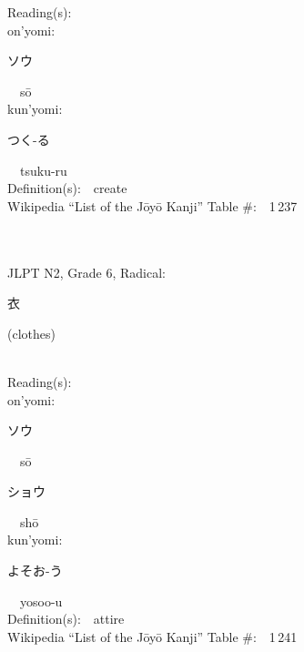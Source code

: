 \begin{multicols}{2}
Reading(s):\ \ \\
{\hspace*{1em}}on'yomi:\ \ \\
{\hspace*{2em}}{\begin{CJK}{UTF8}{min} ソウ \end{CJK}}\ \ s\=o\ \ \\
{\hspace*{1em}}kun'yomi:\ \ \\
{\hspace*{2em}}{\begin{CJK}{UTF8}{min} つく-る \end{CJK}}\ \ tsuku-ru\ \ \\
Definition(s):\ \ create \\
Wikipedia ``List of the J\=oy\=o Kanji'' Table \#:\ \ 1\,237 \\
\ \ \\
{\fontsize{34pt}{40pt}  }\ \ \\  %
{JLPT N2, Grade 6, Radical:\ \ {\begin{CJK}{UTF8}{min} 衣 \end{CJK}} (clothes) } \\
Reading(s):\ \ \\
{\hspace*{1em}}on'yomi:\ \ \\
{\hspace*{2em}}{\begin{CJK}{UTF8}{min} ソウ \end{CJK}}\ \ s\=o\ \ \\
{\hspace*{2em}}{\begin{CJK}{UTF8}{min} ショウ \end{CJK}}\ \ sh\=o\ \ \\
{\hspace*{1em}}kun'yomi:\ \ \\
{\hspace*{2em}}{\begin{CJK}{UTF8}{min} よそお-う \end{CJK}}\ \ yosoo-u\ \ \\
Definition(s):\ \ attire \\
Wikipedia ``List of the J\=oy\=o Kanji'' Table \#:\ \ 1\,241 \\
\ \ \\

\end{multicols}
